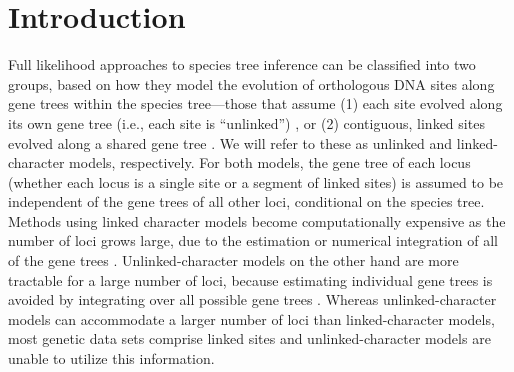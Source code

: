 \section{Introduction}





Full likelihood approaches to species tree inference can be
classified into two groups, based on how they model the 
evolution of orthologous DNA sites along gene trees within the species 
tree---those that assume (1) each site evolved along its own gene tree 
(i.e., each site is ``unlinked'') 
\citep{bryantInferringSpeciesTrees2012, maioPoMoAlleleFrequencyBased2015}, 
or (2) contiguous, linked sites evolved along a shared gene tree 
\citep{liuSpeciesTreesGene2007, Heled2010, ogilvieStarBEAST2BringsFaster2017, 
yangBPPProgramSpecies2015}. We will refer to these as unlinked and 
linked-character models, respectively. For both models, the gene tree of each 
locus (whether each locus is a single site or a segment of linked sites) 
is assumed to be independent of the gene 
trees of all other loci, conditional on the species tree.
Methods using linked character models become computationally expensive as the
number of loci grows large, due to the estimation or numerical integration of
all of the gene trees \citep{bryantInferringSpeciesTrees2012}.
Unlinked-character models on the other 
hand are more tractable for a large number of loci, because  estimating 
individual gene trees is avoided by integrating over all possible gene trees 
\citep{bryantInferringSpeciesTrees2012}.
Whereas unlinked-character models can accommodate a larger number of loci than
linked-character models, most genetic data sets comprise linked sites and
unlinked-character models are unable to utilize this information.

